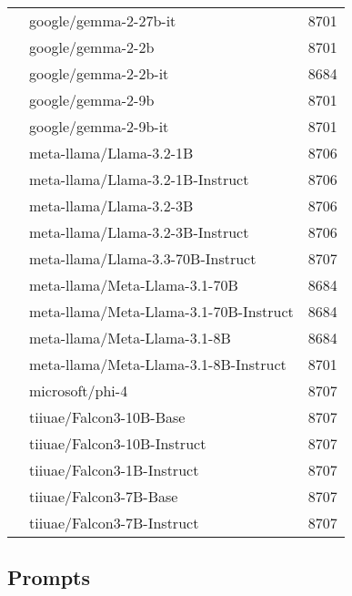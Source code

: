 \begin{table}[]
\begin{tabular}{llr}
 & google/gemma-2-27b-it & 8701 \\
 & google/gemma-2-2b & 8701 \\
 & google/gemma-2-2b-it & 8684 \\
 & google/gemma-2-9b & 8701 \\
 & google/gemma-2-9b-it & 8701 \\
 & meta-llama/Llama-3.2-1B & 8706 \\
 & meta-llama/Llama-3.2-1B-Instruct & 8706 \\
 & meta-llama/Llama-3.2-3B & 8706 \\
 & meta-llama/Llama-3.2-3B-Instruct & 8706 \\
 & meta-llama/Llama-3.3-70B-Instruct & 8707 \\
 & meta-llama/Meta-Llama-3.1-70B & 8684 \\
 & meta-llama/Meta-Llama-3.1-70B-Instruct & 8684 \\
 & meta-llama/Meta-Llama-3.1-8B & 8684 \\
 & meta-llama/Meta-Llama-3.1-8B-Instruct & 8701 \\
 & microsoft/phi-4 & 8707 \\
 & tiiuae/Falcon3-10B-Base & 8707 \\
 & tiiuae/Falcon3-10B-Instruct & 8707 \\
 & tiiuae/Falcon3-1B-Instruct & 8707 \\
 & tiiuae/Falcon3-7B-Base & 8707 \\
 & tiiuae/Falcon3-7B-Instruct & 8707 \\
\bottomrule
\end{tabular}
    \label{tab:Ministral-8B-Instruct-2410}
\end{table}


\subsection{Prompts}

